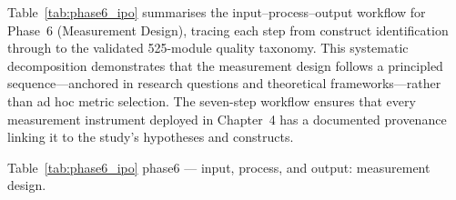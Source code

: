 \normalsize\normalfont\color{black}

Table~\ref{tab:phase6_ipo} summarises the input--process--output workflow for Phase~6 (Measurement Design), tracing each step from construct identification through to the validated 525-module quality taxonomy. This systematic decomposition demonstrates that the measurement design follows a principled sequence---anchored in research questions and theoretical frameworks---rather than ad hoc metric selection. The seven-step workflow ensures that every measurement instrument deployed in Chapter~4 has a documented provenance linking it to the study's hypotheses and constructs.

\begingroup\singlespacing\tablefontsize\tablestripes
\noindent Table~\ref{tab:phase6_ipo} phase6 --- input, process, and output: measurement design.

